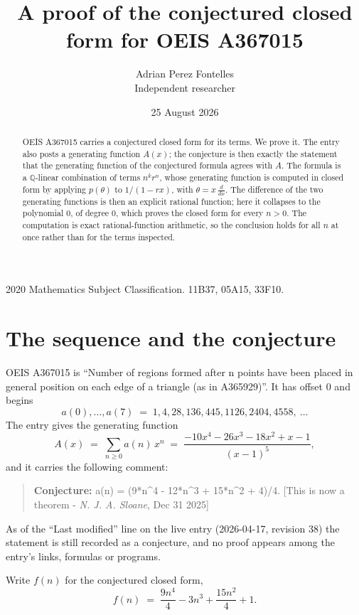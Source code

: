 \documentclass[11pt,a4paper]{article}
\title{A proof of the conjectured closed form for OEIS A367015}
\author{Adrian Perez Fontelles\\ \small Independent researcher}
\date{25 August 2026}
\theoremstyle{plain}
\theoremstyle{definition}
\begin{document}
\maketitle

\begin{abstract}
OEIS A367015 carries a conjectured closed form for its terms. We prove it. The entry
also posts a generating function $A(x)$; the conjecture is then exactly the statement
that the generating function of the conjectured formula agrees with $A$. The formula is
a $\mathbb{Q}$-linear combination of terms $n^{k}r^{n}$, whose generating function is
computed in closed form by applying $p(\theta)$ to $1/(1-rx)$, with
$\theta=x\,\frac{d}{dx}$. The difference of the two generating functions is then an
explicit rational function; here it collapses to the polynomial $0$, of degree
$0$, which proves the closed form for every $n>0$. The computation is exact
rational-function arithmetic, so the conclusion holds for all $n$ at once rather than
for the terms inspected.
\end{abstract}

\noindent\small 2020 Mathematics Subject Classification. 11B37, 05A15, 33F10.\normalsize

\section{The sequence and the conjecture}

OEIS A367015 is ``Number of regions formed after n points have been placed in general position on each edge of a triangle (as in A365929)''. It has offset $0$ and begins
\[
a(0),\dots,a(7)\;=\;1, 4, 28, 136, 445, 1126, 2404, 4558,\ \dots
\]
The entry gives the generating function
\begin{equation}\label{eq:gf}
A(x)\;=\;\sum_{n\ge 0} a(n)\,x^{n}\;=\;\frac{- 10 x^{4} - 26 x^{3} - 18 x^{2} + x - 1}{\left(x - 1\right)^{5}} ,
\end{equation}
and it carries the following comment:
\begin{quote}\small
\textbf{Conjecture:} a(n) = (9*n\^{}4 - 12*n\^{}3 + 15*n\^{}2 + 4)/4. [This is now a theorem - \emph{N. J. A. Sloane}, Dec 31 2025]
\end{quote}
As of the ``Last modified'' line on the live entry (2026-04-17, revision 38) the
statement is still recorded as a conjecture, and no proof appears among the entry's links,
formulas or programs.

Write $f(n)$ for the conjectured closed form,
\[
f(n)\;=\;\frac{9 n^{4}}{4} - 3 n^{3} + \frac{15 n^{2}}{4} + 1 .
\]
\end{document}
